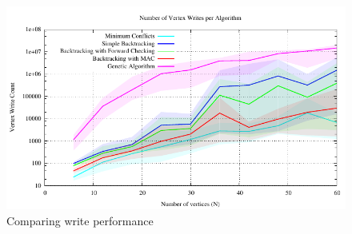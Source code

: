 \documentclass{article}
\begin{document}
\begin{multicols}{2}
\begin{figure}[H]
	\centering
	\includegraphics[width=\linewidth]{../results/comparing_write_performance}
	\caption{Comparing write performance}
\end{figure}

\end{multicols}
\end{document}
